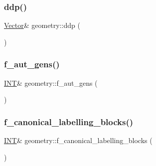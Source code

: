 \mbox{\label{classgeometry_ae00a20f0f75a511d639318673986028e}} 
\subsubsection{\texorpdfstring{ddp()}{ddp()}}
{\footnotesize\ttfamily \mbox{\hyperlink{class_vector}{Vector}}\& geometry\+::ddp (\begin{DoxyParamCaption}{ }\end{DoxyParamCaption})\hspace{0.3cm}{\ttfamily [inline]}}

\mbox{\label{classgeometry_a774f2388490689cf9a1d369327e7e49c}} 
\subsubsection{\texorpdfstring{f\+\_\+aut\+\_\+gens()}{f\_aut\_gens()}}
{\footnotesize\ttfamily \mbox{\hyperlink{galois_8h_a09fddde158a3a20bd2dcadb609de11dc}{I\+NT}}\& geometry\+::f\+\_\+aut\+\_\+gens (\begin{DoxyParamCaption}{ }\end{DoxyParamCaption})\hspace{0.3cm}{\ttfamily [inline]}}

\mbox{\label{classgeometry_a48f58feb451efdf72ce2a5c3411b62c1}} 
\subsubsection{\texorpdfstring{f\+\_\+canonical\+\_\+labelling\+\_\+blocks()}{f\_canonical\_labelling\_blocks()}}
{\footnotesize\ttfamily \mbox{\hyperlink{galois_8h_a09fddde158a3a20bd2dcadb609de11dc}{I\+NT}}\& geometry\+::f\+\_\+canonical\+\_\+labelling\+\_\+blocks (\begin{DoxyParamCaption}{ }\end{DoxyParamCaption})\hspace{0.3cm}{\ttfamily [inline]}}


